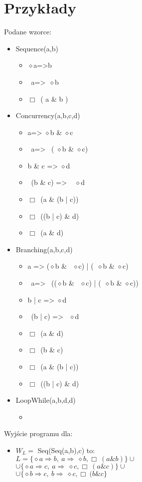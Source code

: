 \documentclass[a4paper, 11pt]{article}
\begin{document}
	\section{Przykłady}
	Podane wzorce:
	
	\begin{itemize}
		\item Sequence(a,b)
		\begin{itemize}
			\item $\diamond$a=>b 	
			\item ~a=>~$\diamond$b
			\item $\Box$~( a \& b )
		\end{itemize}
		\item Concurrency(a,b,c,d)
		\begin{itemize}
			\item a=> $\diamond$b \& $\diamond$c
			\item ~a=> ~( $\diamond$b \& $\diamond$c)
			\item b \& c => $\diamond$d
			\item ~(b \& c) => ~ $\diamond$d
			\item $\Box$~(a \& (b | c))
			\item $\Box$~((b | c) \& d)
			\item $\Box$~(a \& d)	
		\end{itemize}
		\item Branching(a,b,c,d)
		\begin{itemize}
			\item a => ($\diamond$b \& ~$\diamond$c) | (~$\diamond$b \& $\diamond$c)
			\item ~a=> ~(($\diamond$b \& ~$\diamond$c) | (~$\diamond$b \& $\diamond$c))
			\item b | c => $\diamond$d
			\item ~(b | c) => ~$\diamond$d
			\item $\Box$~(a \& d)
			\item $\Box$~(b \& c)
			\item $\Box$~(a \& (b | c))
			\item $\Box$~((b | c) \& d)
		\end{itemize}
		\item LoopWhile(a,b,d,d)
		\begin{itemize}
			\item
		\end{itemize}
	\end{itemize}		
	Wyjście programu dla:
	\begin{itemize}
	\item 	$W_L=$ Seq(Seq(a,b),c) to: \\
	$ L=\{ \diamond a \Rightarrow b , ~a\Rightarrow ~\diamond b, \Box ~(a \& b)\} \cup $ \\
	$ \cup \{\diamond a \Rightarrow c , ~a\Rightarrow ~\diamond c, \Box~(a \& c)\} \cup $\\
	$ \cup \{\diamond b \Rightarrow c , ~b\Rightarrow ~\diamond c, \Box ~(b \& c\} $
	
		
	\end{itemize}
	
\end{document}
